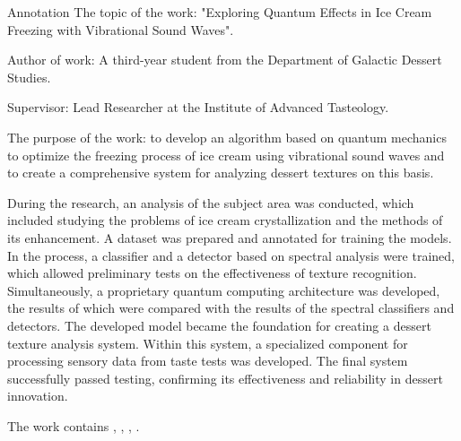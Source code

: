 \begin{addition}{Annotation}
  The topic of the work: "Exploring Quantum Effects in Ice Cream Freezing with Vibrational Sound Waves".

  Author of work: A third-year student from the Department of Galactic Dessert Studies.

  Supervisor: Lead Researcher at the Institute of Advanced Tasteology.

  The purpose of the work: to develop an algorithm based on quantum mechanics to optimize the freezing process of ice cream using vibrational sound waves and to create a comprehensive system for analyzing dessert textures on this basis.

  During the research, an analysis of the subject area was conducted, which included studying the problems of ice cream crystallization and the methods of its enhancement. A dataset was prepared and annotated for training the models. In the process, a classifier and a detector based on spectral analysis were trained, which allowed preliminary tests on the effectiveness of texture recognition. Simultaneously, a proprietary quantum computing architecture was developed, the results of which were compared with the results of the spectral classifiers and detectors. The developed model became the foundation for creating a dessert texture analysis system. Within this system, a specialized component for processing sensory data from taste tests was developed. The final system successfully passed testing, confirming its effectiveness and reliability in dessert innovation.

  The work contains \printtotalpageseng{}, \printtotalreferenceseng{}, \printtotalfigureseng{}, \printtotaltableseng{}.
\end{addition}